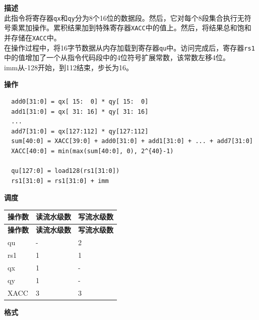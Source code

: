 \textbf{描述}\\
此指令将寄存器\lstinline{qx}和\lstinline{qy}分为8个16位的数据段。然后，它对每个8段集合执行无符号乘累加操作。累积结果加到特殊寄存器\lstinline{XACC}中的值上。然后，将结果总和饱和并存储在\lstinline{XACC}中。\\ 在操作过程中，将16字节数据从内存加载到寄存器\lstinline{qu}中。访问完成后，寄存器\lstinline{rs1}中的值增加了一个从指令代码段中的4位符号扩展常数，该常数左移4位。\\

imm从-128开始，到112结束，步长为16。

\textbf{操作}
\begin{lstlisting}
  add0[31:0] = qx[ 15:  0] * qy[ 15:  0]
  add1[31:0] = qx[ 31: 16] * qy[ 31: 16]
  ...
  add7[31:0] = qx[127:112] * qy[127:112]
  sum[40:0] = XACC[39:0] + add0[31:0] + add1[31:0] + ... + add7[31:0]
  XACC[40:0] = min(max(sum[40:0], 0), 2^{40}-1)

  qu[127:0] = load128(rs1[31:0])
  rs1[31:0] = rs1[31:0] + imm
\end{lstlisting}

\textbf{调度}\\
\begin{longtable}[c]{|l|l|l|}
    \hline
    \rowcolor{lightgray}
    \textbf{操作数} & \textbf{读流水级数} & \textbf{写流水级数} \\\hline
    \endfirsthead
    \hline
    \rowcolor{lightgray}
     \textbf{操作数} & \textbf{读流水级数} & \textbf{写流水级数} \\\hline
    \endhead
    \hline
    \endfoot

    qu & - & 2 \\\hline
    rs1 & 1 & 1 \\\hline
     qx & 1 & - \\\hline
     qy & 1 & - \\\hline
     XACC & 3 & 3

\end{longtable}

\textbf{格式}\\

